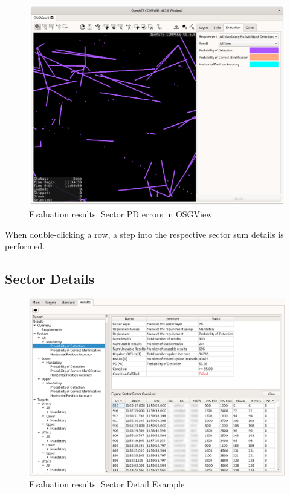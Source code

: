 \begin{figure}[H]
  \hspace*{-2.5cm}
    \includegraphics[width=19cm]{../screenshots/eval_results_pd_sum_osgview.png}
  \caption{Evaluation results: Sector PD errors in OSGView}
\end{figure}

When double-clicking a row, a step into the respective sector sum details is performed.

\subsection{Sector Details}

\begin{figure}[H]
  \hspace*{-2cm}
    \includegraphics[width=18cm,frame]{../screenshots/eval_results_sec_det_example.png}
  \caption{Evaluation results: Sector Detail Example}
\end{figure}

